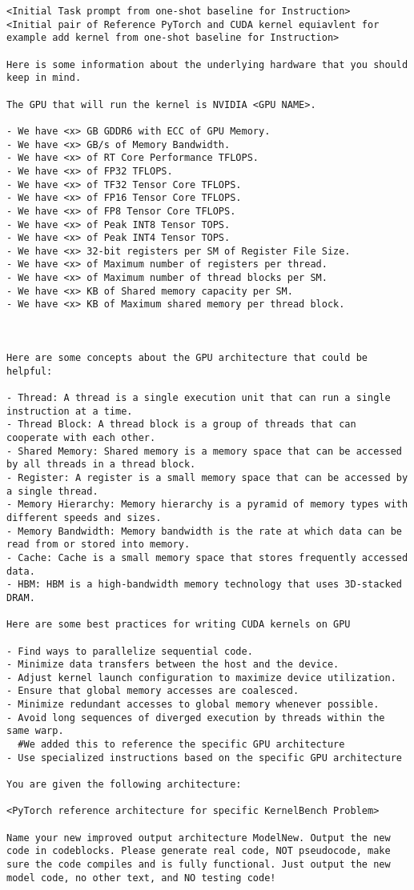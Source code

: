 \begin{lstlisting}
<Initial Task prompt from one-shot baseline for Instruction>
<Initial pair of Reference PyTorch and CUDA kernel equiavlent for example add kernel from one-shot baseline for Instruction>

Here is some information about the underlying hardware that you should keep in mind. 

The GPU that will run the kernel is NVIDIA <GPU NAME>.

- We have <x> GB GDDR6 with ECC of GPU Memory.
- We have <x> GB/s of Memory Bandwidth.
- We have <x> of RT Core Performance TFLOPS.
- We have <x> of FP32 TFLOPS.
- We have <x> of TF32 Tensor Core TFLOPS.
- We have <x> of FP16 Tensor Core TFLOPS.
- We have <x> of FP8 Tensor Core TFLOPS.
- We have <x> of Peak INT8 Tensor TOPS.
- We have <x> of Peak INT4 Tensor TOPS.
- We have <x> 32-bit registers per SM of Register File Size.
- We have <x> of Maximum number of registers per thread.
- We have <x> of Maximum number of thread blocks per SM.
- We have <x> KB of Shared memory capacity per SM.
- We have <x> KB of Maximum shared memory per thread block.



Here are some concepts about the GPU architecture that could be helpful: 

- Thread: A thread is a single execution unit that can run a single instruction at a time.
- Thread Block: A thread block is a group of threads that can cooperate with each other.
- Shared Memory: Shared memory is a memory space that can be accessed by all threads in a thread block.
- Register: A register is a small memory space that can be accessed by a single thread.
- Memory Hierarchy: Memory hierarchy is a pyramid of memory types with different speeds and sizes.
- Memory Bandwidth: Memory bandwidth is the rate at which data can be read from or stored into memory.
- Cache: Cache is a small memory space that stores frequently accessed data.
- HBM: HBM is a high-bandwidth memory technology that uses 3D-stacked DRAM.

Here are some best practices for writing CUDA kernels on GPU

- Find ways to parallelize sequential code.
- Minimize data transfers between the host and the device.
- Adjust kernel launch configuration to maximize device utilization.
- Ensure that global memory accesses are coalesced.
- Minimize redundant accesses to global memory whenever possible.
- Avoid long sequences of diverged execution by threads within the same warp.
  #We added this to reference the specific GPU architecture
- Use specialized instructions based on the specific GPU architecture

You are given the following architecture: 

<PyTorch reference architecture for specific KernelBench Problem>

Name your new improved output architecture ModelNew. Output the new code in codeblocks. Please generate real code, NOT pseudocode, make sure the code compiles and is fully functional. Just output the new model code, no other text, and NO testing code!
\end{lstlisting}

